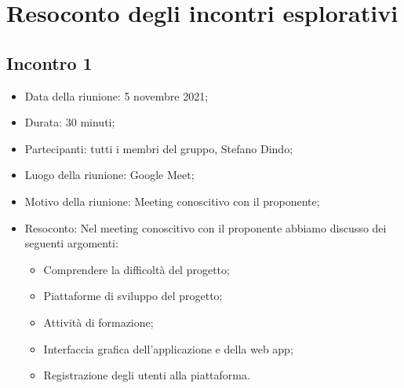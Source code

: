 \section{Resoconto degli incontri esplorativi}
\subsection{Incontro 1}
\begin{itemize}
\item Data della riunione: 5 novembre 2021;
\item Durata: 30 minuti;
\item Partecipanti: tutti i membri del gruppo,  Stefano Dindo;
\item Luogo della riunione: Google Meet;
\item Motivo della riunione: Meeting conoscitivo con il proponente;
\item Resoconto: Nel meeting conoscitivo con il proponente abbiamo discusso dei seguenti argomenti:
	\begin{itemize}
		\item Comprendere la difficoltà del progetto;
		\item Piattaforme di sviluppo del progetto;
		\item Attività di formazione;
		\item Interfaccia grafica dell’applicazione e della web app;
		\item Registrazione degli utenti alla piattaforma.
	\end{itemize}
\end{itemize} 

